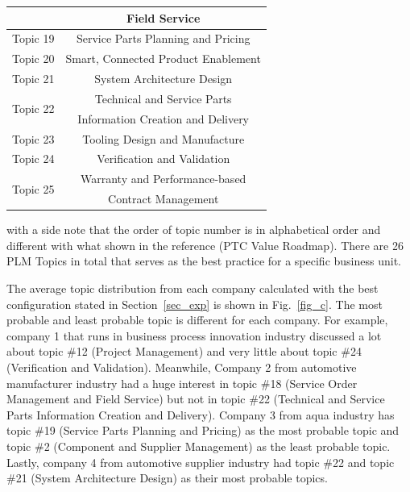 \documentclass[10pt, conference, compsocconf]{IEEEtran}
\begin{document}
\begin{table}[ht]
{\begin{tabular}{|c|c|}
&Field Service \\
\hline
Topic 19&Service Parts Planning and Pricing \\
\hline
Topic 20&Smart, Connected Product Enablement \\
\hline
Topic 21&System Architecture Design \\
\hline
\multirow{2}{*}{Topic 22}&Technical and Service Parts \\
&Information Creation and Delivery\\
\hline
Topic 23&Tooling Design and Manufacture \\
\hline
Topic 24&Verification and Validation \\
\hline
\multirow{2}{*}{Topic 25}&Warranty and Performance-based \\
&Contract Management\\
\hline
\end{tabular}}
\end{table}
with a side note that the order of topic number is in alphabetical order and different with what shown in the reference (PTC Value Roadmap). There are 26 PLM Topics in total that serves as the best practice for a specific business unit.

 The average topic distribution from each company calculated with the best configuration stated in Section~\ref{sec_exp} is shown in Fig.~\ref{fig_c}. The most probable and least probable topic is different for each company. For example, company 1 that runs in business process innovation industry discussed a lot about topic \#12 (Project Management) and very little about topic \#24 (Verification and Validation). Meanwhile, Company 2 from automotive manufacturer industry had a huge interest in topic \#18 (Service Order Management and Field Service) but not in topic \#22 (Technical and Service Parts Information Creation and Delivery). Company 3 from aqua industry has topic \#19 (Service Parts Planning and Pricing) as the most probable topic and topic \#2 (Component and Supplier Management) as the least probable topic. Lastly, company 4 from automotive supplier industry had topic \#22 and topic \#21 (System Architecture Design) as their most probable topics.
\end{document}
